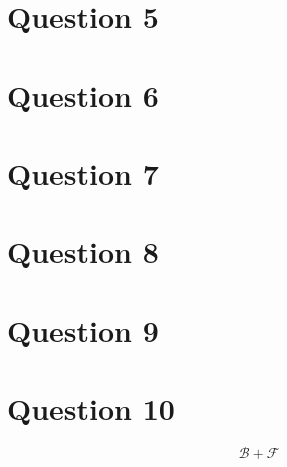 \documentclass{article}
\begin{document}
\section*{Question 5}{

}

\section*{Question 6}{

}

\section*{Question 7}{

}

\section*{Question 8}{

}

\section*{Question 9}{

}

\section*{Question 10}{
    \[\mathcal{B}+\mathcal{F}\]
}
\end{document}
